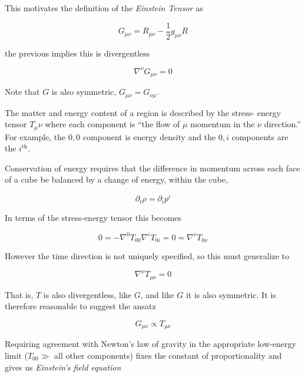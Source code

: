 This motivates the definition of the \emph{Einstein Tensor} as

\begin{equation}
\label{eq:einstein_tensor}
G_{\mu\nu} = R_{\mu\nu} - \frac{1}{2} g_{\mu\nu} R
\end{equation}

the previous implies this is divergentless

\begin{equation*}
\nabla^\nu G_{\mu\nu} = 0
\end{equation*}

Note that $G$ is also symmetric, $G_{\mu\nu} = G_{\nu\mu}$.


The matter and energy content of a region is described by the stress-
energy tensor $T_\mu\nu$ where each component is ``the flow of $\mu$
momentum in the $\nu$ direction.''  For example, the $0,0$ component
is energy density and the $0,i$ components are the $i^\mathrm{th}$.

Conservation of energy requires that the difference in momentum
across each face of a cube be balanced by a change of energy,
within the cube,

\begin{equation*}
\partial_t \rho = \partial_i p^i
\end{equation*}

In terms of the stress-energy tensor this becomes

\begin{equation*}
0 = - \nabla^0 T_{00} \nabla^i T_{0i} = 0
= \nabla^\nu T_{0 \nu}
\end{equation*}

However the time direction is not uniquely specified, so this 
must generalize to

\begin{equation*}
\nabla^\nu T_{\mu\nu} = 0
\end{equation*}

That is, $T$ is also divergentless, like $G$, and like $G$ it is also
symmetric.  It is therefore reasonable to suggest the ansatz

\begin{equation*}
G_{\mu\nu} \propto T_{\mu\nu}
\end{equation*}

Requiring agreement with Newton's law of gravity in the appropriate
low-energy limit ($T_{00} \gg$ all other components) fixes the
constant of proportionality and gives us \emph{Einstein's field
equation}

